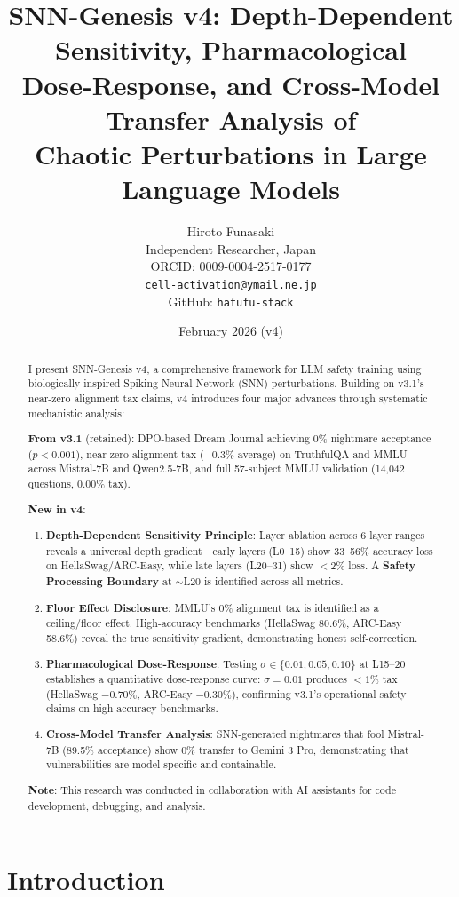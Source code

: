 \documentclass[11pt,a4paper]{article}
\title{SNN-Genesis v4: Depth-Dependent Sensitivity, Pharmacological\\Dose-Response, and Cross-Model Transfer Analysis of\\Chaotic Perturbations in Large Language Models}
\author{Hiroto Funasaki\\
Independent Researcher, Japan\\
ORCID: 0009-0004-2517-0177\\
\texttt{cell-activation@ymail.ne.jp}\\
GitHub: \texttt{hafufu-stack}
}
\date{February 2026 (v4)}
\begin{document}
\maketitle

\begin{abstract}
I present SNN-Genesis v4, a comprehensive framework for LLM safety training using biologically-inspired Spiking Neural Network (SNN) perturbations. Building on v3.1's near-zero alignment tax claims, v4 introduces four major advances through systematic mechanistic analysis:

\textbf{From v3.1} (retained): DPO-based Dream Journal achieving 0\% nightmare acceptance ($p < 0.001$), near-zero alignment tax ($-0.3\%$ average) on TruthfulQA and MMLU across Mistral-7B and Qwen2.5-7B, and full 57-subject MMLU validation (14,042 questions, $0.00\%$ tax).

\textbf{New in v4}:
\begin{enumerate}
    \item \textbf{Depth-Dependent Sensitivity Principle}: Layer ablation across 6 layer ranges reveals a universal depth gradient---early layers (L0--15) show 33--56\% accuracy loss on HellaSwag/ARC-Easy, while late layers (L20--31) show $<2\%$ loss. A \textbf{Safety Processing Boundary} at $\sim$L20 is identified across all metrics.
    \item \textbf{Floor Effect Disclosure}: MMLU's 0\% alignment tax is identified as a ceiling/floor effect. High-accuracy benchmarks (HellaSwag 80.6\%, ARC-Easy 58.6\%) reveal the true sensitivity gradient, demonstrating honest self-correction.
    \item \textbf{Pharmacological Dose-Response}: Testing $\sigma \in \{0.01, 0.05, 0.10\}$ at L15--20 establishes a quantitative dose-response curve: $\sigma=0.01$ produces $<1\%$ tax (HellaSwag $-0.70\%$, ARC-Easy $-0.30\%$), confirming v3.1's operational safety claims on high-accuracy benchmarks.
    \item \textbf{Cross-Model Transfer Analysis}: SNN-generated nightmares that fool Mistral-7B (89.5\% acceptance) show 0\% transfer to Gemini 3 Pro, demonstrating that vulnerabilities are model-specific and containable.
\end{enumerate}

\textbf{Note}: This research was conducted in collaboration with AI assistants for code development, debugging, and analysis.
\end{abstract}

\section{Introduction}
\end{document}
